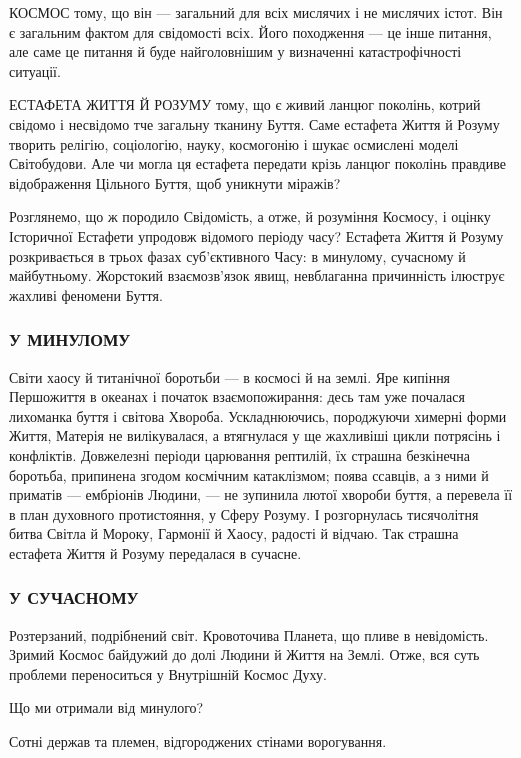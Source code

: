 КОСМОС тому, що він — загальний для всіх мислячих і не мислячих істот. Він є
загальним фактом для свідомості всіх. Його походження — це інше питання, але
саме це питання й буде найголовнішим у визначенні катастрофічності ситуації.

ЕСТАФЕТА ЖИТТЯ Й РОЗУМУ тому, що є живий ланцюг поколінь, котрий свідомо і
несвідомо тче загальну тканину Буття. Саме естафета Життя й Розуму творить
релігію, соціологію, науку, космогонію і шукає осмислені моделі Світобудови.
Але чи могла ця естафета передати крізь ланцюг поколінь правдиве відображення
Цільного Буття, щоб уникнути міражів?

Розглянемо, що ж породило Свідомість, а отже, й розуміння Космосу, і оцінку
Історичної Естафети упродовж відомого періоду часу? Естафета Життя й Розуму
розкривається в трьох фазах суб’єктивного Часу: в минулому, сучасному й
майбутньому. Жорстокий взаємозв’язок явищ, невблаганна причинність ілюструє
жахливі феномени Буття.

\subsubsection{У МИНУЛОМУ}

Світи хаосу й титанічної боротьби — в космосі й на землі. Яре кипіння
Першожиття в океанах і початок взаємопожирання: десь там уже почалася лихоманка
буття і світова Хвороба. Ускладнюючись, породжуючи химерні форми Життя, Матерія
не вилікувалася, а втягнулася у ще жахливіші цикли потрясінь і конфліктів.
Довжелезні періоди царювання рептилій, їх страшна безкінечна боротьба,
припинена згодом космічним катаклізмом; поява ссавців, а з ними й приматів —
ембріонів Людини, — не зупинила лютої хвороби буття, а перевела її в план
духовного протистояння, у Сферу Розуму. І розгорнулась тисячолітня битва Світла
й Мороку, Гармонії й Хаосу, радості й відчаю. Так страшна естафета Життя й
Розуму передалася в сучасне.

\subsubsection{У СУЧАСНОМУ}

Розтерзаний, подрібнений світ. Кровоточива Планета, що пливе в невідомість.
Зримий Космос байдужий до долі Людини й Життя на Землі. Отже, вся суть проблеми
переноситься у Внутрішній Космос Духу.

Що ми отримали від минулого?

Сотні держав та племен, відгороджених стінами ворогування.

